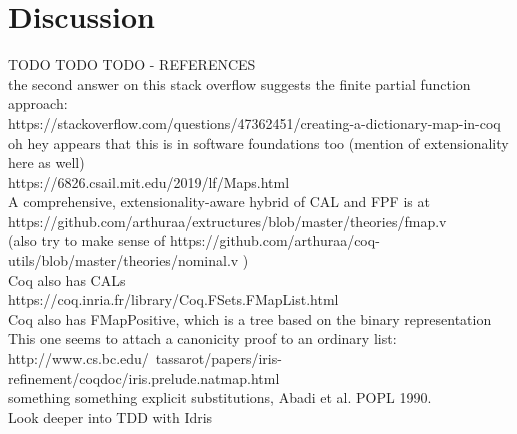 \section{Discussion}
\label{sec:Discussion}




TODO TODO TODO - REFERENCES
\\
the second answer on this stack overflow suggests the finite partial function approach:
\\
https://stackoverflow.com/questions/47362451/creating-a-dictionary-map-in-coq
\\
oh hey appears that this is in software foundations too (mention of extensionality here as well)
\\
https://6826.csail.mit.edu/2019/lf/Maps.html
\\
A comprehensive, extensionality-aware hybrid of CAL and FPF is at
\\
https://github.com/arthuraa/extructures/blob/master/theories/fmap.v
\\
(also try to make sense of https://github.com/arthuraa/coq-utils/blob/master/theories/nominal.v )
\\
Coq also has CALs
\\
https://coq.inria.fr/library/Coq.FSets.FMapList.html
\\
Coq also has FMapPositive, which is a tree based on the binary representation
\\
This one seems to attach a canonicity proof to an ordinary list:
\\
http://www.cs.bc.edu/~tassarot/papers/iris-refinement/coqdoc/iris.prelude.natmap.html
\\
something something explicit substitutions, Abadi et al. POPL 1990.
\\
Look deeper into TDD with Idris

\citep{HazelnutPOPL}
